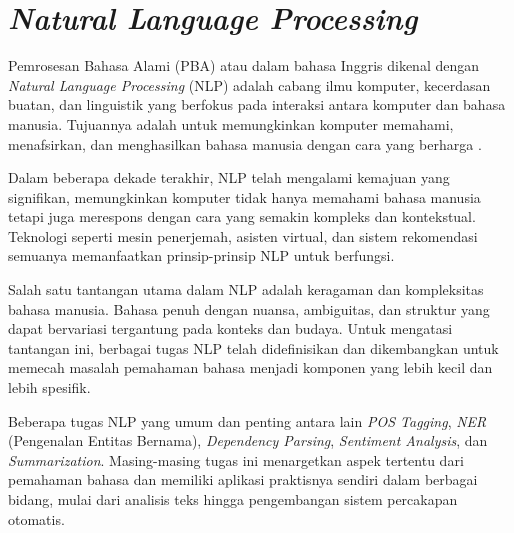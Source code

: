 \section{\textit{Natural Language Processing}}

Pemrosesan Bahasa Alami (PBA) atau dalam bahasa Inggris dikenal dengan \textit{Natural Language Processing} (NLP) adalah cabang ilmu komputer, kecerdasan buatan, dan linguistik yang berfokus pada interaksi antara komputer dan bahasa manusia. Tujuannya adalah untuk memungkinkan komputer memahami, menafsirkan, dan menghasilkan bahasa manusia dengan cara yang berharga \parencite{nlp}.

Dalam beberapa dekade terakhir, NLP telah mengalami kemajuan yang signifikan, memungkinkan komputer tidak hanya memahami bahasa manusia tetapi juga merespons dengan cara yang semakin kompleks dan kontekstual. Teknologi seperti mesin penerjemah, asisten virtual, dan sistem rekomendasi semuanya memanfaatkan prinsip-prinsip NLP untuk berfungsi.

Salah satu tantangan utama dalam NLP adalah keragaman dan kompleksitas bahasa manusia. Bahasa penuh dengan nuansa, ambiguitas, dan struktur yang dapat bervariasi tergantung pada konteks dan budaya. Untuk mengatasi tantangan ini, berbagai tugas NLP telah didefinisikan dan dikembangkan untuk memecah masalah pemahaman bahasa menjadi komponen yang lebih kecil dan lebih spesifik.

Beberapa tugas NLP yang umum dan penting antara lain \textit{POS Tagging}, \textit{NER} (Pengenalan Entitas Bernama), \textit{Dependency Parsing}, \textit{Sentiment Analysis}, dan \textit{Summarization}. Masing-masing tugas ini menargetkan aspek tertentu dari pemahaman bahasa dan memiliki aplikasi praktisnya sendiri dalam berbagai bidang, mulai dari analisis teks hingga pengembangan sistem percakapan otomatis.